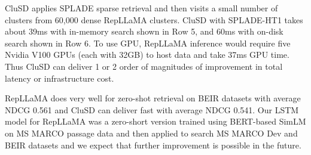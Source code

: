 CluSD applies SPLADE sparse retrieval and then visits  a small number of clusters from 60,000 dense RepLLaMA clusters. 
CluSD  with SPLADE-HT1 takes about 39ms with in-memory search shown in  
Row 5, and  60ms with on-disk search shown in Row 6.  
To use GPU, RepLLaMA inference would require five Nvidia V100 GPUs (each with 32GB) to host data and take 37ms GPU time. 
Thus CluSD  can deliver 1 or 2 order of magnitudes of improvement in total latency or infrastructure cost.

RepLLaMA does very well for zero-shot retrieval on BEIR datasets with average NDCG 
0.561 and CluSD can deliver fast with average NDCG 0.541.
Our LSTM model for RepLLaMA was a zero-short version trained using  BERT-based SimLM on MS MARCO passage 
data and then applied to search MS MARCO Dev and BEIR datasets and we expect that further improvement is possible in the future.

